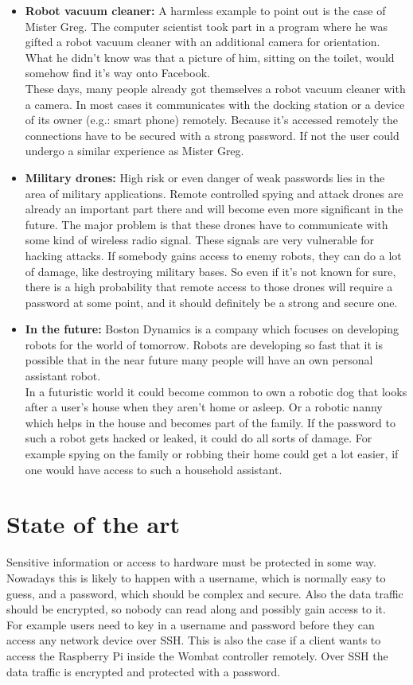 \documentclass[conference]{IEEEtran}
\begin{document}
\begin{itemize}
    \item \textbf{Robot vacuum cleaner:} A harmless example to point out is the case of Mister Greg. The computer scientist took part in a program where he was gifted a robot vacuum cleaner with an additional camera for orientation. What he didn't know was that a picture of him, sitting on the toilet, would somehow find it's way onto Facebook. \cite{b10}\\
          These days, many people already got themselves a robot vacuum cleaner with a camera. In most cases it communicates with the docking station or a device of its owner (e.g.: smart phone) remotely. Because it's accessed remotely the connections have to be secured with a strong password. If not the user could undergo a similar experience as Mister Greg.
    \item \textbf{Military drones:} High risk or even danger of weak passwords lies in the area of military applications. Remote controlled spying and attack drones are already an important part there and will become even more significant in the future. The major problem is that these drones have to communicate with some kind of wireless radio signal. These signals are very vulnerable for hacking attacks. If somebody gains access to enemy robots, they can do a lot of damage, like destroying military bases. So even if it's not known for sure, there is a high probability that remote access to those drones will require a password at some point, and it should definitely be a strong and secure one.
    \item \textbf{In the future:} Boston Dynamics is a company which focuses on developing robots for the world of tomorrow. Robots are developing so fast that it is possible that in the near future many people will have an own personal assistant robot. \cite{b12}\\
          In a futuristic world it could become common to own a robotic dog that looks after a user's house when they aren't home or asleep. Or a robotic nanny which helps in the house and becomes part of the family. If the password to such a robot gets hacked or leaked, it could do all sorts of damage. For example spying on the family or robbing their home could get a lot easier, if one would have access to such a household assistant.
\end{itemize}

\section{State of the art}
Sensitive information or access to hardware must be protected in some way. Nowadays this is likely to happen with a username, which is normally easy to guess, and a password, which should be complex and secure. Also the data traffic should be encrypted, so nobody can read along and possibly gain access to it.\\
For example users need to key in a username and password before they can access any network device over SSH. This is also the case if a client wants to access the Raspberry Pi inside the Wombat controller remotely. Over SSH the data traffic is encrypted and protected with a password.
\end{document}
